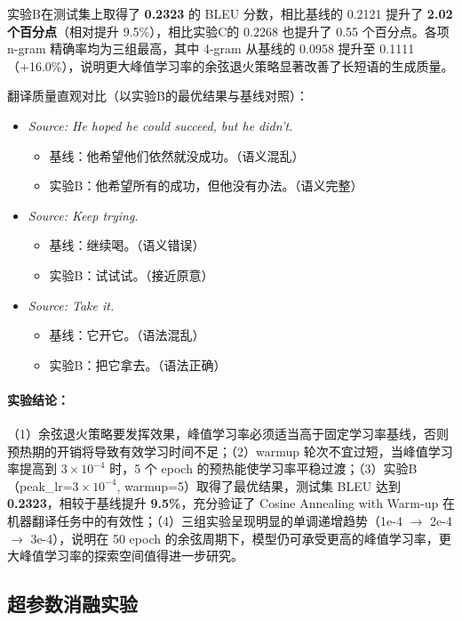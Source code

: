 \documentclass[11pt,a4paper]{article}
\begin{document}
实验B在测试集上取得了 \textbf{0.2323} 的 BLEU 分数，相比基线的 0.2121 提升了 \textbf{2.02 个百分点}（相对提升 9.5\%），相比实验C的 0.2268 也提升了 0.55 个百分点。各项 n-gram 精确率均为三组最高，其中 4-gram 从基线的 0.0958 提升至 0.1111（+16.0\%），说明更大峰值学习率的余弦退火策略显著改善了长短语的生成质量。

翻译质量直观对比（以实验B的最优结果与基线对照）：

\begin{itemize}
    \item \textit{Source: He hoped he could succeed, but he didn't.}
    \begin{itemize}
        \item 基线：他希望他们依然就没成功。（语义混乱）
        \item 实验B：他希望所有的成功，但他没有办法。（语义完整）
    \end{itemize}
    \item \textit{Source: Keep trying.}
    \begin{itemize}
        \item 基线：继续喝。（语义错误）
        \item 实验B：试试试。（接近原意）
    \end{itemize}
    \item \textit{Source: Take it.}
    \begin{itemize}
        \item 基线：它开它。（语法混乱）
        \item 实验B：把它拿去。（语法正确）
    \end{itemize}
\end{itemize}

\paragraph{实验结论：}
（1）余弦退火策略要发挥效果，峰值学习率必须适当高于固定学习率基线，否则预热期的开销将导致有效学习时间不足；（2）warmup 轮次不宜过短，当峰值学习率提高到 $3\times 10^{-4}$ 时，5 个 epoch 的预热能使学习率平稳过渡；（3）实验B（peak\_lr=$3\times 10^{-4}$, warmup=5）取得了最优结果，测试集 BLEU 达到 \textbf{0.2323}，相较于基线提升 \textbf{9.5\%}，充分验证了 Cosine Annealing with Warm-up 在机器翻译任务中的有效性；（4）三组实验呈现明显的单调递增趋势（1e-4 $\rightarrow$ 2e-4 $\rightarrow$ 3e-4），说明在 50 epoch 的余弦周期下，模型仍可承受更高的峰值学习率，更大峰值学习率的探索空间值得进一步研究。

\subsection{超参数消融实验}
\end{document}
